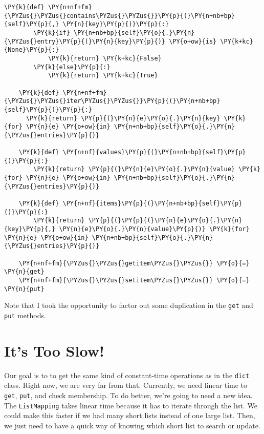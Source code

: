 \begin{Verbatim}[commandchars=\\\{\}]
    \PY{k}{def} \PY{n+nf+fm}{\PYZus{}\PYZus{}contains\PYZus{}\PYZus{}}\PY{p}{(}\PY{n+nb+bp}{self}\PY{p}{,} \PY{n}{key}\PY{p}{)}\PY{p}{:}    
        \PY{k}{if} \PY{n+nb+bp}{self}\PY{o}{.}\PY{n}{\PYZus{}entry}\PY{p}{(}\PY{n}{key}\PY{p}{)} \PY{o+ow}{is} \PY{k+kc}{None}\PY{p}{:}
            \PY{k}{return} \PY{k+kc}{False}
        \PY{k}{else}\PY{p}{:}
            \PY{k}{return} \PY{k+kc}{True}

    \PY{k}{def} \PY{n+nf+fm}{\PYZus{}\PYZus{}iter\PYZus{}\PYZus{}}\PY{p}{(}\PY{n+nb+bp}{self}\PY{p}{)}\PY{p}{:}
      \PY{k}{return} \PY{p}{(}\PY{n}{e}\PY{o}{.}\PY{n}{key} \PY{k}{for} \PY{n}{e} \PY{o+ow}{in} \PY{n+nb+bp}{self}\PY{o}{.}\PY{n}{\PYZus{}entries}\PY{p}{)}

    \PY{k}{def} \PY{n+nf}{values}\PY{p}{(}\PY{n+nb+bp}{self}\PY{p}{)}\PY{p}{:}
        \PY{k}{return} \PY{p}{(}\PY{n}{e}\PY{o}{.}\PY{n}{value} \PY{k}{for} \PY{n}{e} \PY{o+ow}{in} \PY{n+nb+bp}{self}\PY{o}{.}\PY{n}{\PYZus{}entries}\PY{p}{)}

    \PY{k}{def} \PY{n+nf}{items}\PY{p}{(}\PY{n+nb+bp}{self}\PY{p}{)}\PY{p}{:}
        \PY{k}{return} \PY{p}{(}\PY{p}{(}\PY{n}{e}\PY{o}{.}\PY{n}{key}\PY{p}{,} \PY{n}{e}\PY{o}{.}\PY{n}{value}\PY{p}{)} \PY{k}{for} \PY{n}{e} \PY{o+ow}{in} \PY{n+nb+bp}{self}\PY{o}{.}\PY{n}{\PYZus{}entries}\PY{p}{)}

    \PY{n+nf+fm}{\PYZus{}\PYZus{}getitem\PYZus{}\PYZus{}} \PY{o}{=} \PY{n}{get}
    \PY{n+nf+fm}{\PYZus{}\PYZus{}setitem\PYZus{}\PYZus{}} \PY{o}{=} \PY{n}{put}
\end{Verbatim}



Note that I took the opportunity to factor out some duplication in the \texttt{get} and \texttt{put} methods.

\section{It's Too Slow!}


Our goal is to to get the same kind of constant-time operations as in the \texttt{dict} class.  Right now, we are very far from that.  Currently, we need linear time to \texttt{get}, \texttt{put}, and check membership.  To do better, we're going to need a new idea.  The \texttt{ListMapping} takes linear time because it has to iterate through the list.  We could make this faster if we had many short lists instead of one large list.  Then, we just need to have a quick way of knowing which short list to search or update.  


